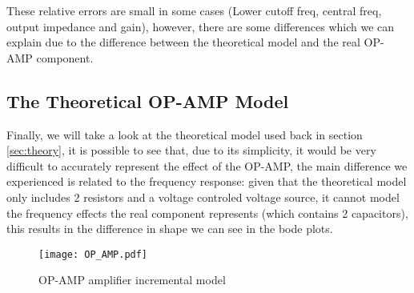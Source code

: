 These relative errors are small in some cases (Lower cutoff freq, central freq, output impedance and gain), however, there are some differences which we can explain due to the difference between the theoretical model and the real OP-AMP component. 

\subsection{The Theoretical OP-AMP Model}
\hspace{12pt} Finally, we will take a look at the theoretical model used back in section \ref{sec:theory}, it is possible to see that, due to its simplicity, it would be very difficult to accurately represent the effect of the OP-AMP, the main difference we experienced is related to the frequency response: given that the theoretical model only includes 2 resistors and a voltage controled voltage source, it cannot model the frequency effects the real component represents (which contains 2 capacitors), this results in the difference in shape we can see in the bode plots.

\begin{figure}[h]
 	\centering
	\texttt{[image: OP\_AMP.pdf]}
	\vspace{-20pt}
	\caption{OP-AMP amplifier incremental model}
	\label{fig:OP-AMP}
\end{figure}

